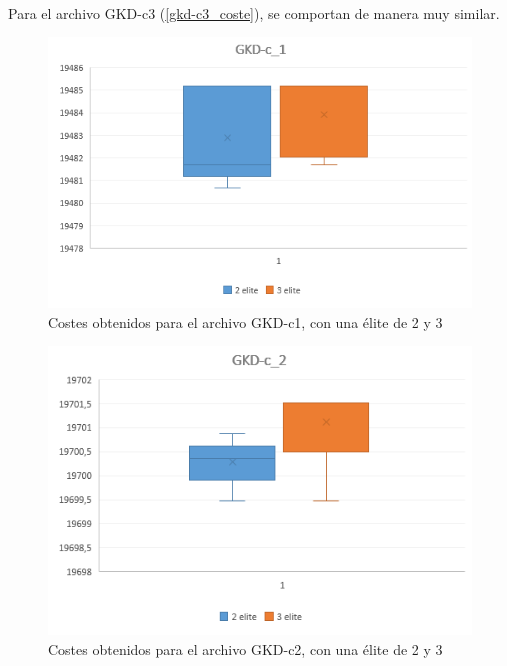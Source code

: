 	\paragraph{} Para el archivo GKD-c3  (\ref{gkd-c3_coste}), se comportan de manera muy similar.
	
	
	\begin{figure}[H]
		
		\centering
		\includegraphics[scale=0.7]{img/MPX_2vs3/GKD-c_1_Costes}
		\caption{Costes obtenidos para el archivo GKD-c1, con una élite de 2 y 3}
		\label{gkd-c1_coste}
	\end{figure}
	\begin{figure}[H]
		\centering
		\includegraphics[scale=0.7]{img/MPX_2vs3/GKD-c_2_Costes}
		\caption{Costes obtenidos para el archivo GKD-c2, con una élite de 2 y 3}
		\label{gkd-c2_coste}
		
	\end{figure}
